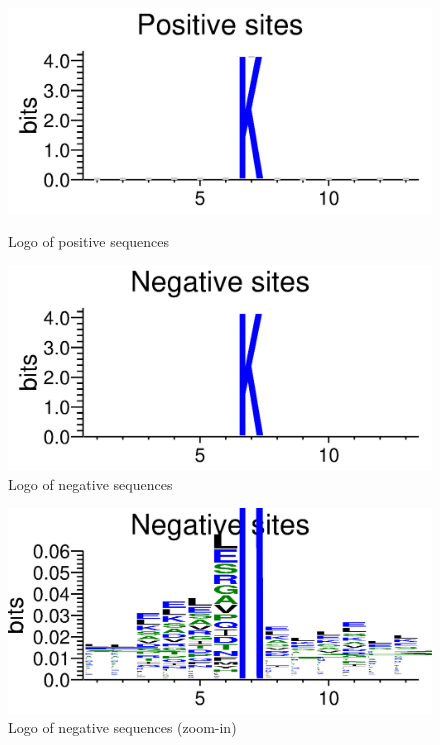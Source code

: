 \documentclass{article}
\begin{document}
\begin{enumerate}
    \begin{figure}[htbp]
        \parbox{0.5\linewidth}{
            \centering
            \includegraphics[width=\linewidth]{images/positive_logo.png}
            \caption{Logo of positive sequences}
        }
        \hfill
        \parbox{0.5\linewidth}{
            \centering
            \includegraphics[width=\linewidth]{images/negative_logo.png}
            \caption{Logo of negative sequences}
        }
    \end{figure}
    \begin{figure}[htbp]
        \parbox{0.5\linewidth}{
            \centering
            \includegraphics[width=\linewidth]{images/negative_logo_zoom.png}
            \caption{Logo of negative sequences (zoom-in)}
}
\end{figure}
\end{enumerate}
\end{document}
